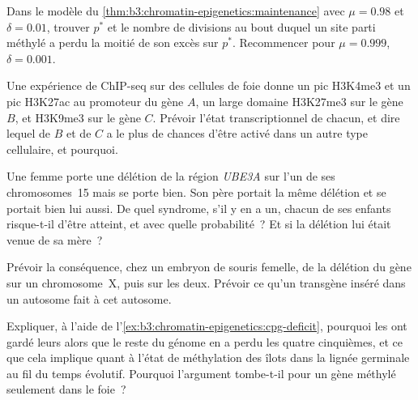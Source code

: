 \begin{exercise}[$\star\star$]\label{exo:b3:chromatin-epigenetics:6}
Dans le modèle du \cref{thm:b3:chromatin-epigenetics:maintenance} avec
$\mu = 0.98$ et $\delta = 0.01$, trouver $p^{*}$ et le nombre de
divisions au bout duquel un site parti méthylé a perdu la moitié de son
excès sur $p^{*}$. Recommencer pour $\mu = 0.999$, $\delta = 0.001$.
\end{exercise}

\begin{exercise}[$\star\star$]\label{exo:b3:chromatin-epigenetics:7}
Une expérience de ChIP-seq sur des cellules de foie donne un pic
H3K4me3 et un pic H3K27ac au promoteur du gène $A$, un large domaine
H3K27me3 sur le gène $B$, et H3K9me3 sur le gène $C$. Prévoir l'état
transcriptionnel de chacun, et dire lequel de $B$ et de $C$ a le plus
de chances d'être activé dans un autre type cellulaire, et pourquoi.
\end{exercise}

\begin{exercise}[$\star\star$]\label{exo:b3:chromatin-epigenetics:8}
Une femme porte une délétion de la région \emph{UBE3A} sur l'un de ses
chromosomes~15 mais se porte bien. Son père portait la même délétion et
se portait bien lui aussi. De quel syndrome, s'il y en a un, chacun de
ses enfants risque-t-il d'être atteint, et avec quelle probabilité~? Et
si la délétion lui était venue de sa mère~?
\end{exercise}

\begin{exercise}[$\star\star$]\label{exo:b3:chromatin-epigenetics:9}
Prévoir la conséquence, chez un embryon de souris femelle, de la
délétion du gène \emph{} sur un chromosome~X, puis sur les deux.
Prévoir ce qu'un transgène \emph{} inséré dans un autosome fait à
cet autosome.
\end{exercise}

\begin{exercise}[$\star\star\star$]\label{exo:b3:chromatin-epigenetics:10}
Expliquer, à l'aide de l'\cref{ex:b3:chromatin-epigenetics:cpg-deficit},
pourquoi les  ont gardé leurs  alors que le reste du génome
en a perdu les quatre cinquièmes, et ce que cela implique quant à
l'état de méthylation des îlots dans la lignée germinale au fil du
temps évolutif. Pourquoi l'argument tombe-t-il pour un gène méthylé
seulement dans le foie~?
\end{exercise}

